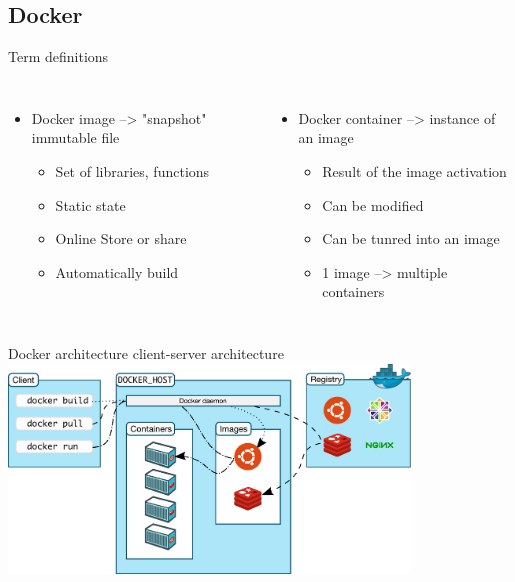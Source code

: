 \subsection{Docker}{Term definitions}
\begin{frame}
\begin{columns}
\begin{itemize}[<1->]
\item Docker image --> "snapshot" immutable file
	\begin{itemize}
	\item Set of libraries, functions
	\item Static state
	\item Online Store or share
	\item Automatically build
	\end{itemize}
\end{itemize}
\begin{itemize}[<2->]
\item Docker container --> instance of an image
	\begin{itemize}
	\item Result of the image activation
	\item Can be modified
	\item Can be tunred into an image
	\item 1 image --> multiple containers 
	\end{itemize}
\end{itemize} 
\end{columns}
\end{frame}

\begin{frame}{Docker architecture}
client-server architecture \\
\centering\includegraphics[width=0.8\textwidth]{images/docker_arch_3.pdf}
\end{frame}

